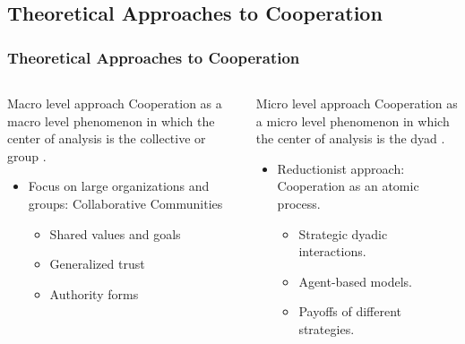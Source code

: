 \documentclass[ignorenonframetext,red,8pt]{beamer}
\begin{document}
\subsection{Theoretical Approaches to Cooperation}
\begin{frame}[label=]
\frametitle{Theoretical Approaches to Cooperation}

\begin{columns}[c]
\begin{column}{0.5\textwidth}

\begin{block}{Macro level approach}
Cooperation as a macro level phenomenon in which the center of analysis is the collective or group \citep{marx:1990, adler:2006, adler:2015}.

\begin{itemize}

\item Focus on large organizations and groups: Collaborative Communities


\begin{itemize}

\item Shared values and goals
\item Generalized trust
\item Authority forms

\end{itemize}
\end{itemize}
\end{block}
\end{column}

\begin{column}{0.5\textwidth}

\begin{block}{Micro level approach}
Cooperation as a micro level phenomenon in which the center of analysis is the dyad \citep{axelrod1981, watts:1999, eguiluz:2005}.

\begin{itemize}

\item Reductionist approach: Cooperation as an atomic process.


\begin{itemize}

\item Strategic dyadic interactions.
\item Agent-based models.
\item Payoffs of different strategies.


\end{itemize}
\end{itemize}
\end{block}
\end{column}
\end{columns}
\end{frame}
\end{document}

